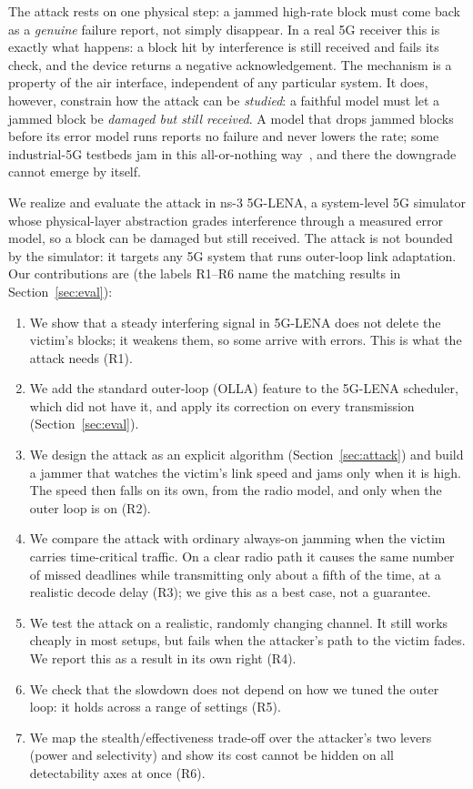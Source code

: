 \documentclass[conference]{IEEEtran}
\begin{document}
The attack rests on one physical step: a jammed high-rate block must come back as a
\emph{genuine} failure report, not simply disappear. In a real 5G receiver this is exactly
what happens: a block hit by interference is still received and fails its check, and the
device returns a negative acknowledgement. The mechanism is a property of the air
interface, independent of any particular system. It does, however, constrain how the attack
can be \emph{studied}: a faithful model must let a jammed block be \emph{damaged but still
received}. A model that drops jammed blocks before its error model runs reports no failure
and never lowers the rate; some industrial-5G testbeds jam in this all-or-nothing
way~\cite{lenz2026security}, and there the downgrade cannot emerge by itself.

We realize and evaluate the attack in ns-3 5G-LENA, a system-level 5G simulator whose
physical-layer abstraction grades interference through a measured error model, so a block
can be damaged but still received. The attack is not bounded by the simulator: it targets
any 5G system that runs outer-loop link adaptation.
Our contributions are (the labels R1--R6 name the matching results in
Section~\ref{sec:eval}):
\begin{enumerate}
\item We show that a steady interfering signal in 5G-LENA does not delete the victim's
blocks; it weakens them, so some arrive with errors. This is what the attack needs
(R1).
\item We add the standard outer-loop (OLLA) feature to the 5G-LENA scheduler, which did
not have it, and apply its correction on every transmission
(Section~\ref{sec:eval}).
\item We design the attack as an explicit algorithm (Section~\ref{sec:attack}) and build
a jammer that watches the victim's link speed and jams only when it is high. The speed
then falls on its own, from the radio model, and only when the outer loop is on (R2).
\item We compare the attack with ordinary always-on jamming when the victim carries
time-critical traffic. On a clear radio path it causes the same number of missed
deadlines while transmitting only about a fifth of the time, at a realistic decode delay
(R3); we give this as a best case, not a guarantee.
\item We test the attack on a realistic, randomly changing channel. It still works
cheaply in most setups, but fails when the attacker's path to the victim fades. We
report this as a result in its own right (R4).
\item We check that the slowdown does not depend on how we tuned the outer loop: it
holds across a range of settings (R5).
\item We map the stealth/effectiveness trade-off over the attacker's two levers (power and
selectivity) and show its cost cannot be hidden on all detectability axes at once (R6).
\end{enumerate}
\end{document}
